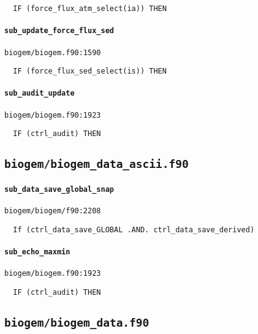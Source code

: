 \documentclass[a4paper,10pt,article]{memoir}
\begin{document}
\begin{verbatim}
  IF (force_flux_atm_select(ia)) THEN
\end{verbatim}

\paragraph{\texttt{sub\_update\_force\_flux\_sed}}

\texttt{biogem/biogem.f90:1590}

\begin{verbatim}
  IF (force_flux_sed_select(is)) THEN
\end{verbatim}

\paragraph{\texttt{sub\_audit\_update}}

\texttt{biogem/biogem.f90:1923}

\begin{verbatim}
  IF (ctrl_audit) THEN
\end{verbatim}


\subsection*{\texttt{biogem/biogem\_data\_ascii.f90}}

\paragraph{\texttt{sub\_data\_save\_global\_snap}}

\texttt{biogem/biogem/f90:2208}

\begin{verbatim}
  If (ctrl_data_save_GLOBAL .AND. ctrl_data_save_derived)
\end{verbatim}

\paragraph{\texttt{sub\_echo\_maxmin}}

\texttt{biogem/biogem.f90:1923}

\begin{verbatim}
  IF (ctrl_audit) THEN
\end{verbatim}


\subsection*{\texttt{biogem/biogem\_data.f90}}
\end{document}
